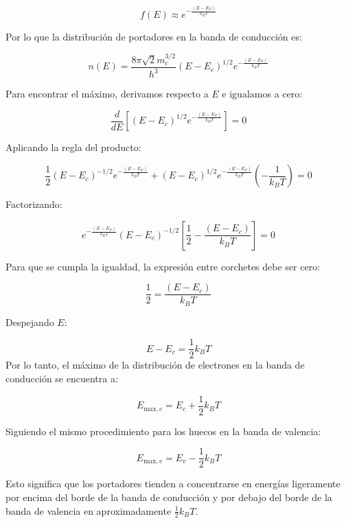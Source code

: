 \begin{texercise}
\begin{enumerate}[label=\alph*)]
\begin{itemize}
		  \[
		  f(E) \approx e^{-\frac{(E - E_F)}{k_B T}}
		  \]
		\end{itemize} 
		
		Por lo que la distribución de portadores en la banda de conducción es:
		
		\[
		n(E) = \frac{8\pi \sqrt{2} m_c^{3/2}}{h^3} (E - E_c)^{1/2} e^{-\frac{(E - E_F)}{k_B T}}
		\]
		
		Para encontrar el máximo, derivamos respecto a \( E \) e igualamos a cero:
		
		\[
		\frac{d}{dE} \left[ (E - E_c)^{1/2} e^{-\frac{(E - E_F)}{k_B T}} \right] = 0
		\]
		
		Aplicando la regla del producto:
		
		\[
		\frac{1}{2} (E - E_c)^{-1/2} e^{-\frac{(E - E_F)}{k_B T}} + (E - E_c)^{1/2} e^{-\frac{(E - E_F)}{k_B T}} \left(-\frac{1}{k_B T} \right) = 0
		\]
		
		Factorizando:
		
		\[
		e^{-\frac{(E - E_F)}{k_B T}} (E - E_c)^{-1/2} \left[ \frac{1}{2} - \frac{(E - E_c)}{k_B T} \right] = 0
		\]
		
		Para que se cumpla la igualdad, la expresión entre corchetes debe ser cero:
		
		\[
		\frac{1}{2} = \frac{(E - E_c)}{k_B T}
		\]
		
		Despejando \( E \):
		
		\[
		E - E_c = \frac{1}{2} k_B T
		\]
		Por lo tanto, el máximo de la distribución de electrones en la banda de conducción se encuentra a:
		
		\[
		E_{\text{max}, c} = E_c + \frac{1}{2} k_B T
		\]
		
		Siguiendo el mismo procedimiento para los huecos en la banda de valencia:
		
		\[
		E_{\text{max}, v} = E_v - \frac{1}{2} k_B T
		\]
		
		Esto significa que los portadores tienden a concentrarse en energías ligeramente por encima del borde de la banda de conducción y por debajo del borde de la banda de valencia en aproximadamente \( \frac{1}{2} k_B T \).
		
	\end{enumerate}
\end{texercise}


